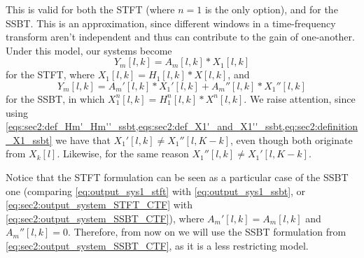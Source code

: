 This is valid for both the STFT (where $n = 1$ is the only option), and for the SSBT. This is an approximation, since different windows in a time-frequency transform aren't independent and thus can contribute to the gain of one-another. Under this model, our systems become
\begin{equation}
	\label{eq:sec2:output_system_STFT_CTF}
	Y_m[l,k] = A_m[l,k] \ast X_1[l,k]
\end{equation}
for the STFT, where $X_1[l,k] = H_1[l,k] \ast X[l,k]$, and
\begin{equation}
	\label{eq:sec2:output_system_SSBT_CTF}
	Y_m[l,k] = A_m'[l,k] \ast X_1'[l,k] + A_m''[l,k] \ast X_1''[l,k]
\end{equation}
for the SSBT, in which $X_1^n[l,k] = H_1^n[l,k] \ast X^n[l,k]$. We raise attention, since using \cref{eqs:sec2:def_Hm'_Hm''_ssbt,eqs:sec2:def_X1'_and_X1''_ssbt,eq:sec2:definition_X1_ssbt} we have that $X_{1}'[l,k] \neq X_{1}''[l,K-k]$, even though both originate from $X_k[l]$. Likewise, for the same reason $X_{1}''[l,k] \neq X_{1}'[l,K-k]$.

Notice that the STFT formulation can be seen as a particular case of the SSBT one (comparing \cref{eq:output_sys1_stft} with \cref{eq:output_sys1_ssbt}, or \cref{eq:sec2:output_system_STFT_CTF} with \cref{eq:sec2:output_system_SSBT_CTF}), where $A_{m}'[l,k] = A_{m}[l,k]$ and $A_{m}''[l,k] = 0$. Therefore, from now on we will use the SSBT formulation from \cref{eq:sec2:output_system_SSBT_CTF}, as it is a less restricting model.